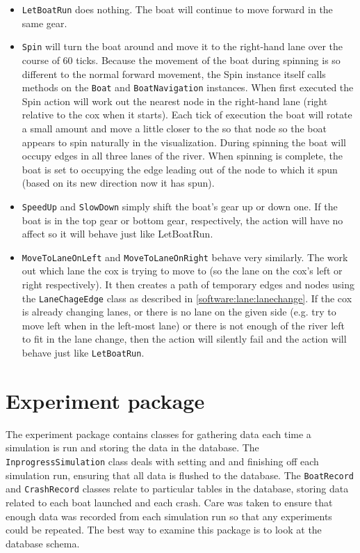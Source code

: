   \begin{itemize}
  
    \item \texttt{LetBoatRun} does nothing. The boat will continue to move forward in the same gear.
  
    \item \texttt{Spin} will turn the boat around and move it to the right-hand lane over the course of 60 ticks. Because the movement of the boat during spinning is so different to the normal forward movement, the Spin instance itself calls methods on the \texttt{Boat} and \texttt{BoatNavigation} instances. When first executed the Spin action will work out the nearest node in the right-hand lane (right relative to the cox when it starts). Each tick of execution the boat will rotate a small amount and move a little closer to the so that node so the boat appears to spin naturally in the visualization. During spinning the boat will occupy edges in all three lanes of the river. When spinning is complete, the boat is set to occupying the edge leading out of the node to which it spun (based on its new direction now it has spun).
  
    \item \texttt{SpeedUp} and \texttt{SlowDown} simply shift the boat's gear up or down one. If the boat is in the top gear or bottom gear, respectively, the action will have no affect so it will behave just like LetBoatRun.
  
    \item \texttt{MoveToLaneOnLeft} and \texttt{MoveToLaneOnRight} behave very similarly. The work out which lane the cox is trying to move to (so the lane on the cox's left or right respectively). It then creates a path of temporary edges and nodes using the \texttt{LaneChageEdge} class as described in \ref{software:lane:lanechange}. If the cox is already changing lanes, or there is no lane on the given side (e.g. try to move left when in the left-most lane) or there is not enough of the river left to fit in the lane change, then the action will silently fail and the action will behave just like \texttt{LetBoatRun}.
  \end{itemize}
\section{Experiment package}\label{software:experiment}
The experiment package contains classes for gathering data each time a
simulation is run and storing the data in the database. The
\texttt{InprogressSimulation} class deals with setting and and finishing off
each simulation run, ensuring that all data is flushed to the
database. The \texttt{BoatRecord} and \texttt{CrashRecord} classes relate to particular
tables in the database, storing data related to each boat launched and
each crash. Care was taken to ensure that enough data was recorded
from each simulation run so that any experiments could be repeated.
The best way to examine this package is to look at the database schema.

